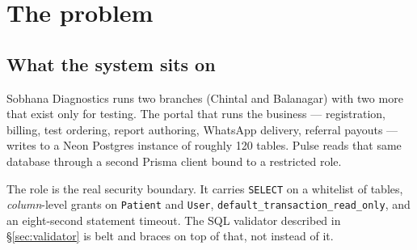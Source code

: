 \documentclass[11pt,a4paper]{report}
\newcommand{\code}[1]{\texttt{\small #1}}
\newenvironment{fitpic}
  {\par\medskip\begin{center}\begin{lrbox}{\fitbox}}
  {\end{lrbox}%
   \ifdim\wd\fitbox>\textwidth \resizebox{\textwidth}{!}{\usebox{\fitbox}}%
   \else \usebox{\fitbox}\fi
   \end{center}\medskip}
\begin{document}
\chapter{The problem}

\section{What the system sits on}

Sobhana Diagnostics runs two branches (Chintal and Balanagar) with two more that exist only for
testing. The portal that runs the business --- registration, billing, test ordering, report
authoring, WhatsApp delivery, referral payouts --- writes to a Neon Postgres instance of roughly
120 tables. Pulse reads that same database through a second Prisma client bound to a restricted
role.

\begin{fitpic}
\end{fitpic}

The role is the real security boundary. It carries \code{SELECT} on a whitelist of tables,
\emph{column}-level grants on \code{Patient} and \code{User},
\code{default\_transaction\_read\_only}, and an eight-second statement timeout. The SQL validator
described in \S\ref{sec:validator} is belt and braces on top of that, not instead of it.
\end{document}
